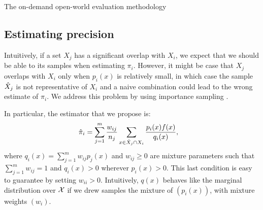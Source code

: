 \begin{algorithm}
  \caption{\label{alg:on-demand-sampling} The on-demand open-world evaluation methodology}
\begin{algorithmic}


  \ENDFOR{}
  \ENDFOR{}
\end{algorithmic}
\end{algorithm}

\subsection{Estimating precision}

Intuitively, if a set $X_j$ has a significant overlap with $X_i$, we expect that we should be able to its samples when estimating $\pi_i$.
However, it might be case that $X_j$ overlaps with $X_i$ only when $p_i(x)$ is relatively small, in which case the sample ${\hat{X}}_j$ is not representative of $X_i$ and a naive combination could lead to the wrong estimate of $\pi_i$.
We address this problem by using importance sampling \citep{owen2013monte}.

In particular, the estimator that we propose is:
\begin{align*}
  {\hat{\pi}}_i &= \sum_{j=1}^m \frac{w_{ij}}{n_{j}} \sum_{x \in {\hat{X}}_j \cap X_i} \frac{p_i(x) f(x)}{q_i(x)},
\end{align*}
where $q_i(x) = \sum_{j=1}^m w_{ij} p_j(x)$ and $w_{ij} \ge 0$ are mixture parameters such that $\sum_{j=1}^m w_{ij} = 1$ and $q_i(x) > 0$ wherever $p_i(x) > 0$.
This last condition is easy to guarantee by setting $w_{ii} > 0$.
Intuitively, $q(x)$ behaves like the marginal distribution over $\mathcal{X}$ if we drew samples the mixture of $(p_i(x))$, with mixture weights $(w_i)$.

